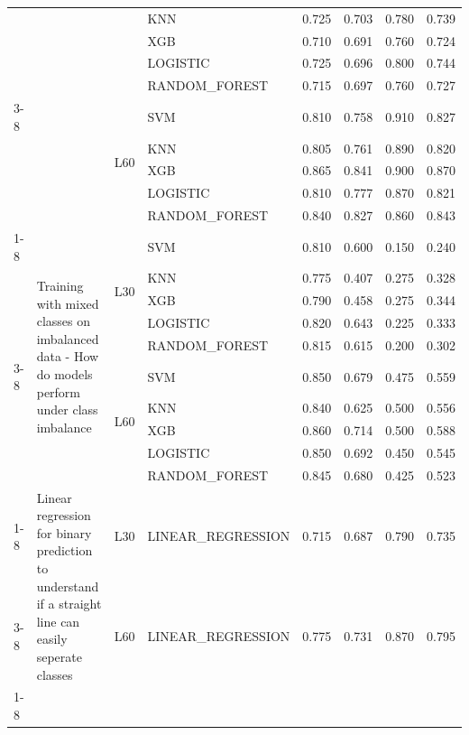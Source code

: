 \begin{table}
\begin{tabular}{llllrrrr}
 &  &  & KNN & 0.725 & 0.703 & 0.780 & 0.739 \\
 &  &  & XGB & 0.710 & 0.691 & 0.760 & 0.724 \\
 &  &  & LOGISTIC & 0.725 & 0.696 & 0.800 & 0.744 \\
 &  &  & RANDOM\_FOREST & 0.715 & 0.697 & 0.760 & 0.727 \\
\cline{3-8}
 &  & \multirow[t]{5}{*}{L60} & SVM & 0.810 & 0.758 & 0.910 & 0.827 \\
 &  &  & KNN & 0.805 & 0.761 & 0.890 & 0.820 \\
 &  &  & XGB & 0.865 & 0.841 & 0.900 & 0.870 \\
 &  &  & LOGISTIC & 0.810 & 0.777 & 0.870 & 0.821 \\
 &  &  & RANDOM\_FOREST & 0.840 & 0.827 & 0.860 & 0.843 \\
\cline{1-8} \cline{2-8} \cline{3-8}
\multirow[t]{10}{*}{Experiment 9} & \multirow[t]{10}{*}{Training with mixed classes on imbalanced data - How do models perform under class imbalance} & \multirow[t]{5}{*}{L30} & SVM & 0.810 & 0.600 & 0.150 & 0.240 \\
 &  &  & KNN & 0.775 & 0.407 & 0.275 & 0.328 \\
 &  &  & XGB & 0.790 & 0.458 & 0.275 & 0.344 \\
 &  &  & LOGISTIC & 0.820 & 0.643 & 0.225 & 0.333 \\
 &  &  & RANDOM\_FOREST & 0.815 & 0.615 & 0.200 & 0.302 \\
\cline{3-8}
 &  & \multirow[t]{5}{*}{L60} & SVM & 0.850 & 0.679 & 0.475 & 0.559 \\
 &  &  & KNN & 0.840 & 0.625 & 0.500 & 0.556 \\
 &  &  & XGB & 0.860 & 0.714 & 0.500 & 0.588 \\
 &  &  & LOGISTIC & 0.850 & 0.692 & 0.450 & 0.545 \\
 &  &  & RANDOM\_FOREST & 0.845 & 0.680 & 0.425 & 0.523 \\
\cline{1-8} \cline{2-8} \cline{3-8}
\multirow[t]{2}{*}{Experiment 10} & \multirow[t]{2}{*}{Linear regression for binary prediction to understand if a straight line can easily seperate classes} & L30 & LINEAR\_REGRESSION & 0.715 & 0.687 & 0.790 & 0.735 \\
\cline{3-8}
 &  & L60 & LINEAR\_REGRESSION & 0.775 & 0.731 & 0.870 & 0.795 \\
\cline{1-8} \cline{2-8} \cline{3-8}
\bottomrule
\end{tabular}
\end{table}
